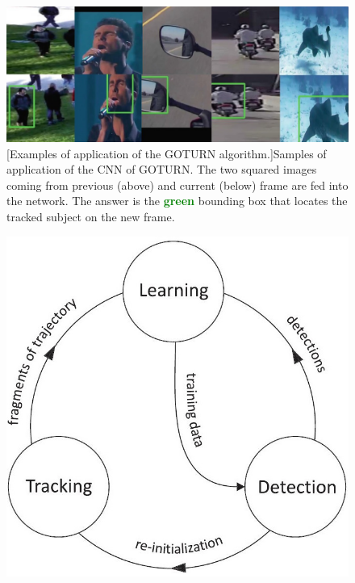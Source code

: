 \begin{figure}
	\centering
	\begin{minipage}{.62\textwidth}
		\centering
		\includegraphics[width=1\linewidth]{images/tracking/sample_GOTURN}
		\captionsetup{margin=0.5cm}
		[Examples of application of the GOTURN algorithm.]{Samples of application of the CNN of GOTURN. The two squared images coming from previous (above) and current (below) frame are fed into the network. The answer is the \textbf{\textcolor{green}{green}} bounding box that locates the tracked subject on the new frame.}
		\label{fig:sample_GOTURN}
	\end{minipage}
	\hspace{0.03\linewidth}
	\begin{minipage}{.32\textwidth}
		\centering
		\includegraphics[width=1\linewidth]{images/tracking/howItWorks_TLD}
		\label{fig:howItWorks_TLD}
	\end{minipage}
\end{figure}


